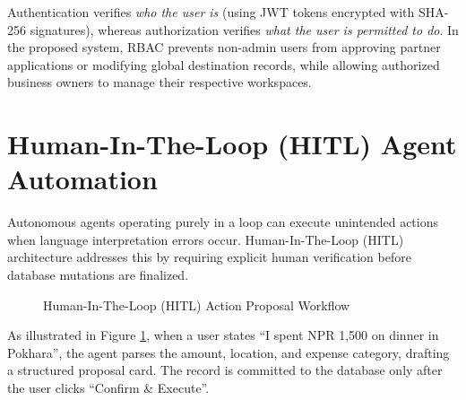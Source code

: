 \documentclass[12pt,a4paper]{report}
\begin{document}
Authentication verifies \emph{who the user is} (using JWT tokens encrypted with SHA-256 signatures), whereas authorization verifies \emph{what the user is permitted to do}. In the proposed system, RBAC prevents non-admin users from approving partner applications or modifying global destination records, while allowing authorized business owners to manage their respective workspaces.

\section{Human-In-The-Loop (HITL) Agent Automation}
Autonomous agents operating purely in a loop can execute unintended actions when language interpretation errors occur. Human-In-The-Loop (HITL) architecture addresses this by requiring explicit human verification before database mutations are finalized.

\begin{figure}[htbp]
\centering
{}
\caption{Human-In-The-Loop (HITL) Action Proposal Workflow}
\label{fig:hitl_workflow}
\end{figure}

As illustrated in Figure \ref{fig:hitl_workflow}, when a user states ``I spent NPR 1,500 on dinner in Pokhara'', the agent parses the amount, location, and expense category, drafting a structured proposal card. The record is committed to the database only after the user clicks ``Confirm \& Execute''.
\end{document}
